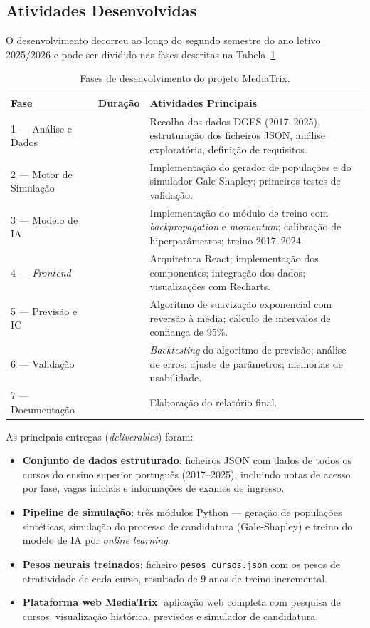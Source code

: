 \documentclass[12pt,a4paper]{article}
\begin{document}
\subsection{Atividades Desenvolvidas}

O desenvolvimento decorreu ao longo do segundo semestre do ano letivo 2025/2026 e pode ser dividido nas fases descritas na Tabela~\ref{tab:fases}.

\begin{table}[H]
\centering
\caption{Fases de desenvolvimento do projeto MediaTrix.}
\label{tab:fases}
\begin{tabularx}{\textwidth}{llX}
\toprule
\textbf{Fase} & \textbf{Duração} & \textbf{Atividades Principais} \\
\midrule
1 --- Análise e Dados &  & Recolha dos dados DGES (2017--2025), estruturação dos ficheiros JSON, análise exploratória, definição de requisitos. \\
2 --- Motor de Simulação &  & Implementação do gerador de populações e do simulador Gale-Shapley; primeiros testes de validação. \\
3 --- Modelo de IA &  & Implementação do módulo de treino com \textit{backpropagation} e \textit{momentum}; calibração de hiperparâmetros; treino 2017--2024. \\
4 --- \textit{Frontend} &  & Arquitetura React; implementação dos componentes; integração dos dados; visualizações com Recharts. \\
5 --- Previsão e IC &  & Algoritmo de suavização exponencial com reversão à média; cálculo de intervalos de confiança de 95\%. \\
6 --- Validação &  & \textit{Backtesting} do algoritmo de previsão; análise de erros; ajuste de parâmetros; melhorias de usabilidade. \\
7 --- Documentação &  & Elaboração do relatório final. \\
\bottomrule
\end{tabularx}
\end{table}

As principais entregas (\textit{deliverables}) foram:

\begin{itemize}[noitemsep]
  \item \textbf{Conjunto de dados estruturado}: ficheiros JSON com dados de todos os cursos do ensino superior português (2017--2025), incluindo notas de acesso por fase, vagas iniciais e informações de exames de ingresso.
  \item \textbf{Pipeline de simulação}: três módulos Python --- geração de populações sintéticas, simulação do processo de candidatura (Gale-Shapley) e treino do modelo de IA por \textit{online learning}.
  \item \textbf{Pesos neurais treinados}: ficheiro \texttt{pesos\_cursos.json} com os pesos de atratividade de cada curso, resultado de 9 anos de treino incremental.
  \item \textbf{Plataforma web MediaTrix}: aplicação web completa com pesquisa de cursos, visualização histórica, previsões e simulador de candidatura.
\end{itemize}
\end{document}
